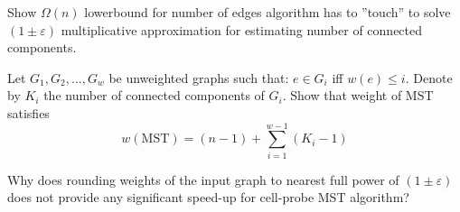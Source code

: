 \documentclass[12pt]{uebung}
\begin{document}
 

\newcommand{\bigo}{\mathcal{O}}
\renewcommand{\aufgname}{Exercise}
\begin{aufg}
Show $\Omega(n)$ lowerbound for number of edges algorithm has to ''touch'' to solve $(1\pm\varepsilon)$ multiplicative approximation for estimating number of connected components.
\end{aufg}

\begin{aufg}
Let $G_1,G_2,\ldots,G_w$ be unweighted graphs such that: $e \in G_i$ iff $w(e) \le i$. Denote by $K_i$ the number of connected components of $G_i$.
Show that weight of MST satisfies
$$w(\text{MST}) = (n-1) + \sum_{i=1}^{w-1} (K_i - 1)$$
\end{aufg}

\begin{aufg}
Why does rounding weights of the input graph to nearest full power of $(1\pm \varepsilon)$ does not provide any significant speed-up for cell-probe MST algorithm?
\end{aufg}
\end{document}
